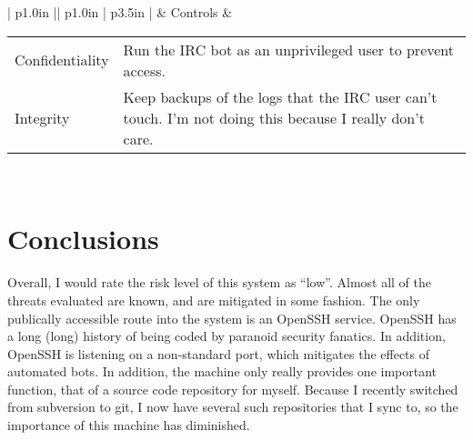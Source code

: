 \documentclass[11pt]{article}
\begin{document}
\begin{longtable}{| p{1.0in} || p{1.0in} | p{3.5in} |}
        & Controls 
            & \begin{tabular}{p{1in} p{2.2in}} 
            Confidentiality 
                & Run the IRC bot as an unprivileged user to prevent access. \\
            Integrity
                & Keep backups of the logs that the IRC user can't touch.  
                  I'm not doing this because I really don't care. \\
            \end{tabular} \\
    \hline

\end{longtable}

\section{Conclusions}

Overall, I would rate the risk level of this system as ``low''.  Almost all 
of the threats evaluated are known, and are mitigated in some fashion.  The 
only publically accessible route into the system is an OpenSSH service. 
OpenSSH has a long (long) history of being coded by paranoid security fanatics.
In addition, OpenSSH is listening on a non-standard port, which mitigates
the effects of automated bots. In addition, the machine only really provides 
one important function, that of a source code repository for myself. Because
I recently switched from subversion to git, 
I now have several such repositories that I sync to, so the importance of this
machine has diminished.
\end{document}
